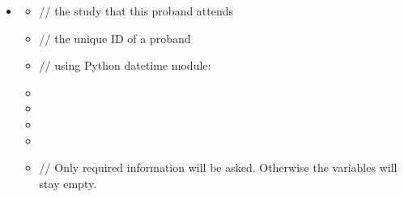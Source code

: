 \documentclass[a4paper]{scrreprt}
\begin{document}
\begin{itemize}
                    \item {}
                        \begin{itemize}
                            \item {}
                                \par // the study that this proband attends
                            \item {}
                                \par // the unique ID of a proband
                            \item {}
                                \par // using Python datetime module: 
                            \item {}
                            \item {}
                            \item {}
                            \item {}
                            \item {}
                                \par // Only required information will be asked. Otherwise the variables will stay empty.
                        \end{itemize}


\end{itemize}
\end{document}
